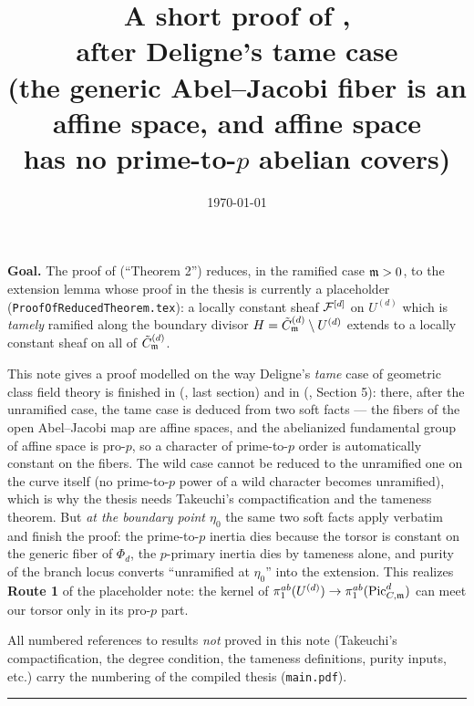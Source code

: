 \documentclass[11pt]{article}
\title{A short proof of
\texorpdfstring{\Cref{lemma:ExtensionOfTamelyRamifiedSheaf}}{the extension lemma},\\
after Deligne's tame case\\
\large (the generic Abel--Jacobi fiber is an affine space, and affine space\\
has no prime-to-\texorpdfstring{$p$}{p} abelian covers)}
\author{}
\date{\today}
\begin{document}
\maketitle

\noindent\textbf{Goal.}
The proof of  (``Theorem 2'') reduces, in the ramified
case $\mdls > 0$, to the extension lemma whose proof in the thesis is
currently a placeholder (\texttt{ProofOfReducedTheorem.tex}): a locally
constant sheaf $\cF^{[d]}$ on $U^{(d)}$ which is \emph{tamely} ramified along
the boundary divisor $H = \Cmod{d} \setminus U^{(d)}$ extends to a locally
constant sheaf on all of $\Cmod{d}$.

This note gives a proof modelled on the way Deligne's \emph{tame} case of
geometric class field theory is finished in
(\cite{tendler2015geometricclassfieldtheory}, last section) and in
(\cite{Guignard2018}, Section 5): there, after the unramified case, the tame
case is deduced from two soft facts --- the fibers of the open Abel--Jacobi
map are affine spaces, and the abelianized fundamental group of affine space
is pro-$p$, so a character of prime-to-$p$ order is automatically constant
on the fibers. The wild case cannot be reduced to the unramified one on the
curve itself (no prime-to-$p$ power of a wild character becomes unramified),
which is why the thesis needs Takeuchi's compactification and the tameness
theorem. But \emph{at the boundary point $\eta_0$} the same two soft facts
apply verbatim and finish the proof: the prime-to-$p$ inertia dies because
the torsor is constant on the generic fiber of $\Phi_d$, the $p$-primary
inertia dies by tameness alone, and purity of the branch locus converts
``unramified at $\eta_0$'' into the extension. This realizes \textbf{Route 1}
of the placeholder note: the kernel of
$\pi_1^{ab}(U^{(d)}) \to \pi_1^{ab}(\PicCm[d])$ can meet our torsor only in
its pro-$p$ part.

All numbered references to results \emph{not} proved in this note
(Takeuchi's compactification, the degree condition, the tameness
definitions, purity inputs, etc.) carry the numbering of the compiled thesis
(\texttt{main.pdf}).

\bigskip
\hrule
\bigskip



\printbibliography
\end{document}
